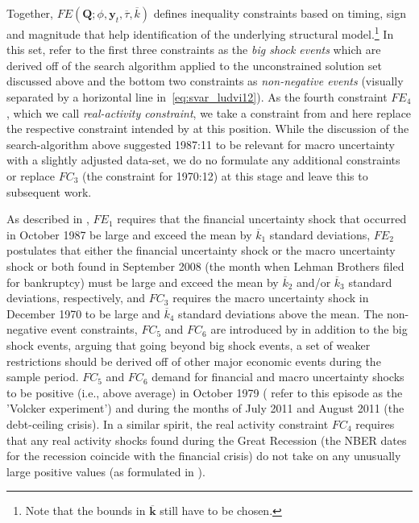 \documentclass[a4paper,11pt,listof=nochaptergap,oneside,pointednumbers,bibtotoc,bigheadings,liststotoc,hidelinks]{scrbook}
\theoremstyle{mysatz}
\theoremstyle{mydefinition}
\theoremstyle{mytheorem}
\theoremstyle{mybemerkung}
\newcommand{\vect}[1]{\boldsymbol{\mathbf{#1}}}
\begin{document}
 Together, $FE(\vect{Q}; \phi, \vect{y}_t, \overline{\tau}, \overline{k})$ defines inequality constraints based on timing, sign and magnitude that help identification of the underlying structural model.\footnote{Note that the bounds in $\overline{\vect{k}}$ still have to be chosen.} In this set, \citet{ludvigsonetal:19} refer to the first three constraints as the \textit{big shock events} which are derived off of the search algorithm applied to the unconstrained solution set discussed above and the bottom two constraints as \textit{non-negative events} (visually separated by a horizontal line in~\ref{eq:svar_ludvi12}). As the fourth constraint $FE_4$, which we call \textit{real-activity constraint}, we take a constraint from \citet{ludvigsonetal:18} and here replace the respective constraint intended by \citet{ludvigsonetal:19} at this position. While the discussion of the search-algorithm above suggested 1987:11 to be relevant for macro uncertainty with a slightly adjusted data-set, we do no formulate any additional constraints or replace $FC_3$ (the constraint for 1970:12) at this stage and leave this to subsequent work.

As described in \citet{ludvigsonetal:19}, $FE_1$ requires that the financial uncertainty shock that occurred in October 1987 be large and exceed the mean by $\overline{k}_1$ standard deviations, $FE_2$ postulates that either the financial uncertainty shock or the macro uncertainty shock or both found in September 2008 (the month when Lehman Brothers filed for bankruptcy) must be large and exceed the mean by $\overline{k}_2$ and/or $\overline{k}_3$ standard deviations, respectively, and $FC_3$ requires the macro uncertainty shock in December 1970 to be large and $\overline{k}_4$ standard deviations above the mean. The non-negative event constraints, $FC_5$ and $FC_6$ are introduced by \citet{ludvigsonetal:19} in addition to the big shock events, arguing that going beyond big shock events, a set of weaker restrictions should be derived off of other major economic events during the sample period. $FC_5$ and $FC_6$ demand for financial and macro uncertainty shocks to be positive (i.e., above average) in October 1979 (\citet{ludvigsonetal:19} refer to this episode as the 'Volcker experiment') and during the months of July 2011 and August 2011 (the debt-ceiling crisis). In a similar spirit, the real activity constraint $FC_4$ requires that any real activity shocks found during the Great Recession (the NBER dates for the recession coincide with the financial crisis) do not take on any unusually large positive values (as formulated in \citealp{ludvigsonetal:18}).
\end{document}
